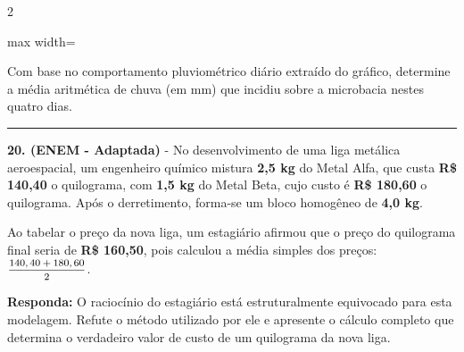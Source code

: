 \documentclass[twoside, 10pt, a4paper]{article}
\newlength{\espacoPreQuestao}
\newlength{\espacoQuestao}
\begin{document}
\begin{multicols*}{2}
\begin{center}
\begin{adjustbox}{max width=\linewidth}
\end{adjustbox}
\end{center}
\par
Com base no comportamento pluviométrico diário extraído do gráfico, determine a média aritmética de chuva (em mm) que incidiu sobre a microbacia nestes quatro dias.
\par\vspace{\espacoQuestao}

\noindent\textcolor{CorLinha}{\rule{\linewidth}{0.5pt}}
\par\vspace{\espacoPreQuestao}
\textbf{20. (ENEM - Adaptada)} - No desenvolvimento de uma liga metálica aeroespacial, um engenheiro químico mistura \textbf{2,5 kg} do Metal Alfa, que custa \textbf{R\$ 140,40} o quilograma, com \textbf{1,5 kg} do Metal Beta, cujo custo é \textbf{R\$ 180,60} o quilograma. Após o derretimento, forma-se um bloco homogêneo de \textbf{4,0 kg}.

Ao tabelar o preço da nova liga, um estagiário afirmou que o preço do quilograma final seria de \textbf{R\$ 160,50}, pois calculou a média simples dos preços: $ \mfrac{140,40 + 180,60}{2} $.
\begin{boxresponda}
\textbf{Responda:} O raciocínio do estagiário está estruturalmente equivocado para esta modelagem. Refute o método utilizado por ele e apresente o cálculo completo que determina o verdadeiro valor de custo de um quilograma da nova liga.
\end{boxresponda}
\par\vspace{\espacoQuestao}


\end{multicols*}
\end{document}
